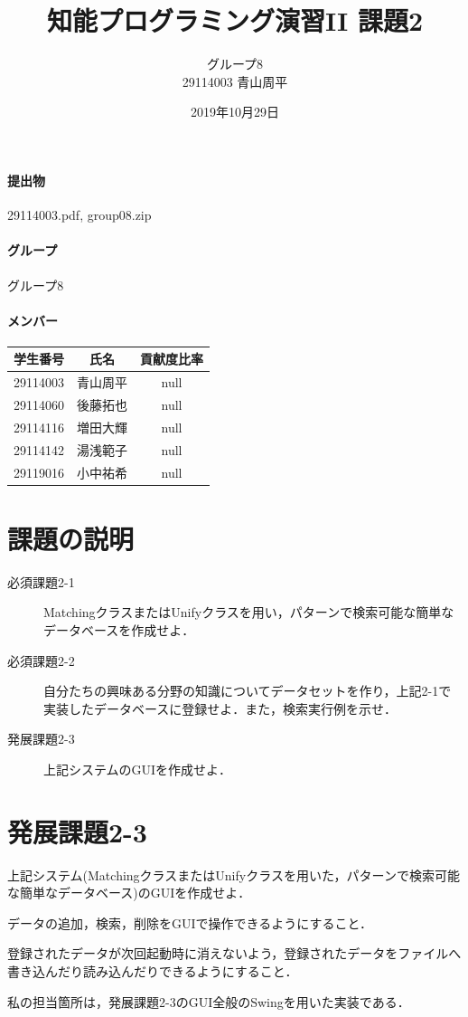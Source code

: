 \documentclass[12pt]{jarticle}
\title{知能プログラミング演習II 課題2}
\author{グループ8\\
  29114003 青山周平\\
}
\date{2019年10月29日}
\begin{document}
\maketitle

\paragraph{提出物} 29114003.pdf, group08.zip
\paragraph{グループ} グループ8
\paragraph{メンバー}
\begin{tabular}{|c|c|c|}
  \hline
  学生番号&氏名&貢献度比率\\
  \hline\hline
  29114003&青山周平&null\\
  \hline
  29114060&後藤拓也&null\\
  \hline
  29114116&増田大輝&null\\
  \hline
  29114142&湯浅範子&null\\
  \hline
  29119016&小中祐希&null\\
  \hline
\end{tabular}



\section{課題の説明}
\begin{description}
\item[必須課題2-1] MatchingクラスまたはUnifyクラスを用い，パターンで検索可能な簡単なデータベースを作成せよ．
\item[必須課題2-2] 自分たちの興味ある分野の知識についてデータセットを作り，上記2-1で実装したデータベースに登録せよ．また，検索実行例を示せ．
\item[発展課題2-3] 上記システムのGUIを作成せよ．
\end{description}


\section{発展課題2-3}
\begin{screen}
上記システム(MatchingクラスまたはUnifyクラスを用いた，パターンで検索可能な簡単なデータベース)のGUIを作成せよ．

データの追加，検索，削除をGUIで操作できるようにすること．

登録されたデータが次回起動時に消えないよう，登録されたデータをファイルへ書き込んだり読み込んだりできるようにすること．
\end{screen}
私の担当箇所は，発展課題2-3のGUI全般のSwingを用いた実装である．
\end{document}
